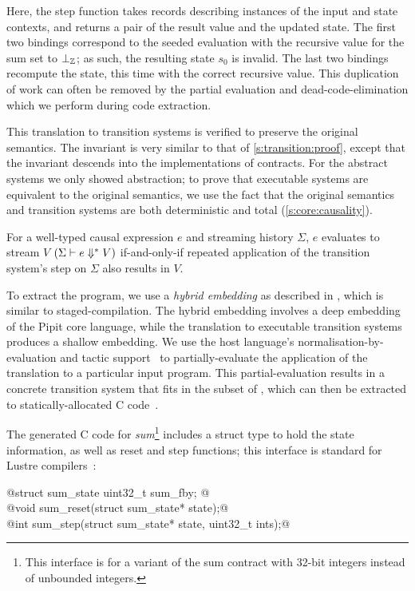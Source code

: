 Here, the step function takes records describing instances of the input and state contexts, and returns a pair of the result value and the updated state.
The first two bindings correspond to the seeded evaluation with the recursive value for the sum set to $\bot_{\mathbb{Z}}$; as such, the resulting state $s_0$ is invalid.
The last two bindings recompute the state, this time with the correct recursive value.
This duplication of work can often be removed by the partial evaluation and dead-code-elimination which we perform during code extraction.

This translation to transition systems is verified to preserve the original semantics.
The invariant is very similar to that of \autoref{s:transition:proof}, except that the invariant descends into the implementations of contracts.
For the abstract systems we only showed abstraction; to prove that executable systems are equivalent to the original semantics, we use the fact that the original semantics and transition systems are both deterministic and total (\autoref{s:core:causality}).

\begin{theorem}
  For a well-typed causal expression $e$ and streaming history $\Sigma$, $e$ evaluates to stream $V$ $(\Sigma \vdash e \Downarrow^{*} V)$ if-and-only-if repeated application of the transition system's step on $\Sigma$ also results in $V$.
\end{theorem}

To extract the program, we use a \emph{hybrid embedding} as described in \cite{ho2022noise}, which is similar to staged-compilation.
The hybrid embedding involves a deep embedding of the Pipit core language, while the translation to executable transition systems produces a shallow embedding.
We use the \fstar{} host language's normalisation-by-evaluation and tactic support~\cite{martinez2019meta} to partially-evaluate the application of the translation to a particular input program.
This partial-evaluation results in a concrete transition system that fits in the \lowstar{} subset of \fstar{}, which can then be extracted to statically-allocated C code~\cite{protzenko2017verified}.

The generated C code for \emph{sum}\footnote{This interface is for a variant of the sum contract with 32-bit integers instead of unbounded integers.} includes a struct type to hold the state information, as well as reset and step functions; this interface is standard for Lustre compilers~\cite{bourke2017formally,gerard2012modular}:
  \begin{tabbing}
    @struct sum_state { uint32_t sum_fby; }@ \\
    @void   sum_reset(struct sum_state* state);@ \\
    @int    sum_step(struct sum_state* state, uint32_t ints);@
  \end{tabbing}

